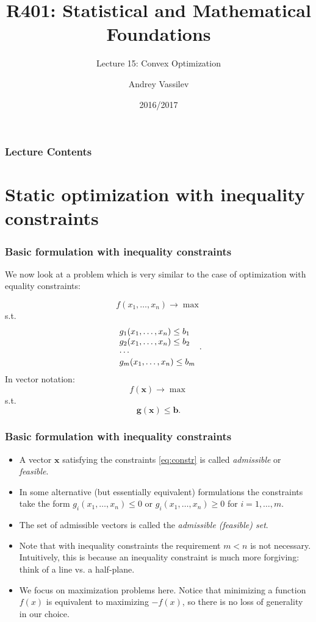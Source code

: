 \documentclass[10pt]{beamer}
\title{R401: Statistical and Mathematical Foundations}
\subtitle{Lecture 15: Convex Optimization}
\author{Andrey Vassilev}
\date{2016/2017}
\theoremstyle{definition}
\begin{document}
\maketitle



\begin{frame}[fragile]
\frametitle{Lecture Contents}
\tableofcontents
\end{frame}

\section{Static optimization with inequality constraints}\label{sec:ineq}

\begin{frame}[fragile]
\frametitle{Basic formulation with inequality constraints}
We now look at a problem which is very similar to the case of optimization with equality constraints:

\begin{equation}
f(x_1,\ldots,x_n)\rightarrow \max 
\label{eq:obj}
\end{equation}
s.t.
\begin{equation}
\begin{array}{l l l}
g_1(x_1,\ldots,x_n) \leq b_1\\
g_2(x_1,\ldots,x_n) \leq b_2\\
\cdots \\
g_m(x_1,\ldots,x_n) \leq b_m\\
\end{array}.
\label{eq:constr}
\end{equation}
In vector notation:
\[ f(\mathbf{x}) \rightarrow \max \]
s.t. \[ \mathbf{g}(\mathbf{x})\leq \mathbf{b}. \]
\end{frame}

\begin{frame}[fragile]
\frametitle{Basic formulation with inequality constraints}
\begin{itemize}
\item A vector $ \mathbf{x} $ satisfying the constraints \eqref{eq:constr} is called \emph{admissible} or \emph{feasible}.\bigskip
\item In some alternative (but essentially equivalent) formulations the constraints take the form
$ g_i(x_1,\ldots,x_n)\leq 0 $ or $ g_i(x_1,\ldots,x_n)\geq 0 $ for $ i=1,\ldots,m $.\bigskip
\item The set of admissible vectors is called the \emph{admissible (feasible) set}.\bigskip
\item Note that with inequality constraints the requirement $ m<n $ is not necessary. Intuitively, this is because an inequality constraint is much more forgiving: think of a line vs. a half-plane.\bigskip
\item We focus on maximization problems here. Notice that minimizing a function $ f(x) $ is equivalent to maximizing $ -f(x) $, so there is no loss of generality in our choice.
\end{itemize}
\end{frame}
\end{document}
